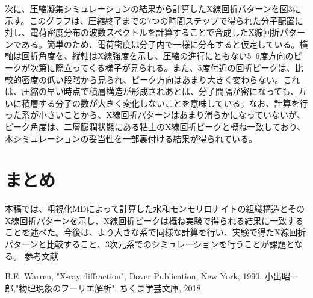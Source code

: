 ﻿\documentclass[11pt,a4j]{jarticle}
\begin{document}
次に、圧縮凝集シミュレーションの結果から計算したX線回折パターンを図3に示す。このグラフは、圧縮終了までの7つの時間ステップで得られた分子配置に対し、電荷密度分布の波数スペクトルを計算することで合成したX線回折パターンである。簡単のため、電荷密度は分子内で一様に分布すると仮定している。横軸は回折角度を、縦軸はX線強度を示し、圧縮の進行にともない5~6度方向のピークが次第に際立ってくる様子が見られる。また、5度付近の回折ピークは、比較的密度の低い段階から見られ、ピーク方向はあまり大きく変わらない。これは、圧縮の早い時点で積層構造が形成されあとは、分子間隔が密になっても、互いに積層する分子の数が大きく変化しないことを意味している。なお、計算を行った系が小さいことから、X線回折パターンはあまり滑らかになっていないが、ピーク角度は、二層膨潤状態にある粘土のX線回折ピークと概ね一致しており、本シミュレーションの妥当性を一部裏付ける結果が得られている。
\section{まとめ}
本稿では、粗視化MDによって計算した水和モンモリロナイトの組織構造とそのX線回折パターンを示し、X線回折ピークは概ね実験で得られる結果に一致することを述べた。今後は、より大きな系で同様な計算を行い、実験で得たX線回折パターンと比較すること、3次元系でのシミュレーションを行うことが課題となる。
参考文献
\begin{thebibliography}{99}
	B.E. Warren, "X-ray diffraction", Dover Publication, New York, 1990.
	小出昭一郎,"物理現象のフーリエ解析", ちくま学芸文庫, 2018.
\end{thebibliography}
\end{document}
